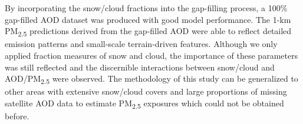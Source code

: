 \documentclass[a0paper,portrait]{baposter}
\newcommand{\tsub}{\textsubscript}
\begin{document}
\begin{poster}
{
\begin{spacing}{0.9}
\small{
By incorporating the snow/cloud fractions into the gap-filling process, a 100\% gap-filled AOD dataset was produced with good model performance. The 1-km PM\tsub{2.5} predictions derived from the gap-filled AOD were able to reflect detailed emission patterns and small-scale terrain-driven features. Although we only applied fraction measures of snow and cloud, the importance of these parameters was still reflected and the discernible interactions between snow/cloud and AOD/PM\tsub{2.5} were observed. The methodology of this study can be generalized to other areas with extensive snow/cloud covers and large proportions of missing satellite AOD data to estimate PM\tsub{2.5} exposures which could not be obtained before.
}
\end{spacing}
}

\end{poster}
\end{document}
